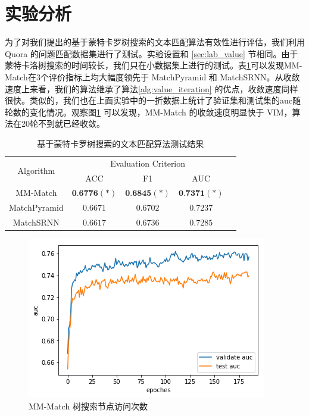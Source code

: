 \section{实验分析}
为了对我们提出的基于蒙特卡罗树搜索的文本匹配算法有效性进行评估，我们利用 Quora 的问题匹配数据集进行了测试。实验设置和 \ref{sec:lab_value} 节相同。由于蒙特卡洛树搜索的时间较长，我们只在小数据集上进行的测试。表\ref{tab:MCTS_small_test}可以发现MM-Match在3个评价指标上均大幅度领先于 MatchPyramid 和 MatchSRNN。从收敛速度上来看，我们的算法继承了算法\ref{alg:value_iteration} 的优点，收敛速度同样很快。类似的，我们也在上面实验中的一折数据上统计了验证集和测试集的auc随轮数的变化情况。观察图\ref{fig:MCTS_line} 可以发现，MM-Match 的收敛速度明显快于 VIM，算法在20轮不到就已经收敛。
\begin{table}[htbp]
\caption{基于蒙特卡罗树搜索的文本匹配算法测试结果}\label{tab:MCTS_small_test}
\vspace{0.5em}\centering
\begin{tabular}{ccccc}
\toprule[1.5pt]
	\multirow{2}{*}{Algorithm} &
	\multicolumn{3}{c}{\multirow{1}{*}{Evaluation Criterion}} \\
	\cline{2-4} & ACC & F1 & AUC \\
	\midrule[1pt]
	MM-Match & $\textbf{0.6776}(*)$ & $\textbf{0.6845}(*)$ & $\textbf{0.7371}(*)$ \\
    MatchPyramid & $0.6671$ & $0.6702$ & $0.7237$ \\
    MatchSRNN & $0.6617$ & $0.6736$ & $0.7285$\\
\bottomrule[1.5pt]
\end{tabular}
\vspace{\baselineskip}
\end{table}



\begin{figure}[!htbp]
\vspace{1em}
\centering
  \includegraphics[width=0.7\linewidth]{figures/MCTS_line}
  \caption{MM-Match 树搜索节点访问次数}
  \label{fig:MCTS_line}       %
\vspace{1em}
\end{figure}

